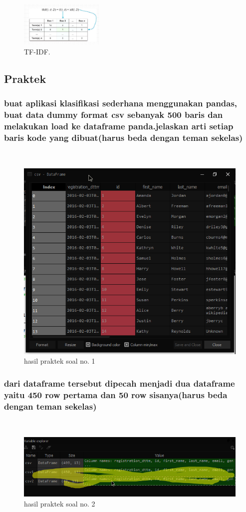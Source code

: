 \begin{figure}[H]
\centering
\includegraphics[width=4cm]{figures/1174067/4/5.jpg}
\caption{TF-IDF.}
\end{figure}

\subsection{Praktek}
\subsubsection{buat aplikasi klasifikasi sederhana menggunakan pandas, buat data dummy format csv sebanyak 500 baris dan melakukan load ke dataframe panda.jelaskan arti setiap baris kode yang dibuat(harus beda dengan teman sekelas)}
\hfill\\

	\begin{figure}[H]
	\centering
		\includegraphics[width=8 cm]{figures/1174067/4/7.png}
	\caption{hasil praktek soal no. 1}
	\end{figure}


\subsubsection{dari dataframe tersebut dipecah menjadi dua dataframe yaitu 450 row pertama dan 50 row sisanya(harus beda dengan teman sekelas)}
\hfill\\

	\begin{figure}[H]
	\centering
		\includegraphics[width=8 cm]{figures/1174067/4/8.png}
	\caption{hasil praktek soal no. 2}
	\end{figure}

